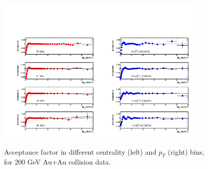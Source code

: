 \begin{figure}
\begin{centering}
\includegraphics[width=0.45\textwidth]{fig/3.Analysis/Run11/Acc_cen}\includegraphics[width=0.45\textwidth]{fig/3.Analysis/Run11/Acc_pT}
\par\end{centering}

\protect\caption{Acceptance factor in different centrality (left) and $p_{T}$ (right)
bins, for 200 GeV Au+Au collision data.}


\label{fig:acc pT cen}
\end{figure}


